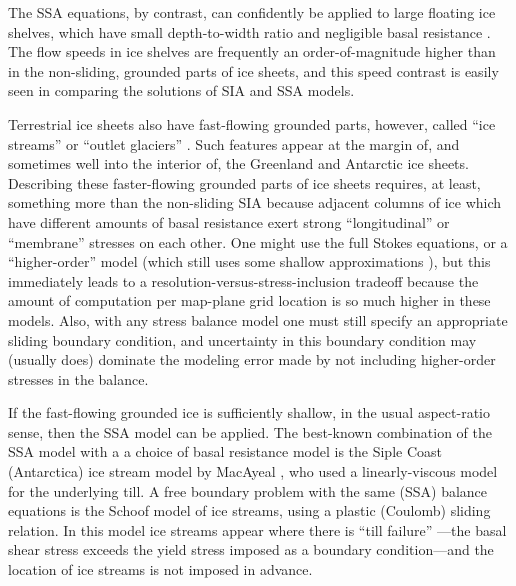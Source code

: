 \documentclass[titlepage,letterpaper,final]{scrartcl}
\begin{document}
The SSA equations, by contrast, can confidently be applied to large floating ice shelves, which have small depth-to-width ratio and negligible basal resistance \cite{Morland,MorlandZainuddin}.  The flow speeds in ice shelves are frequently an order-of-magnitude higher than in the non-sliding, grounded parts of ice sheets, and this speed contrast is easily seen in comparing the solutions of SIA and SSA models.

Terrestrial ice sheets also have fast-flowing grounded parts, however, called ``ice streams'' or ``outlet glaciers'' \cite{TrufferEchelmeyer}.  Such features appear at the margin of, and sometimes well into the interior of, the Greenland \cite{Joughinetal2001} and Antarctic \cite{BamberVaughanJoughin} ice sheets.  Describing these faster-flowing grounded parts of ice sheets requires, at least, something more than the non-sliding SIA because adjacent columns of ice which have different amounts of basal resistance exert strong ``longitudinal'' or ``membrane'' stresses \cite{SchoofStream} on each other.  One might use the full Stokes equations, or a ``higher-order'' model (which still uses some shallow approximations \cite{Blatter,Pattyn03}), but this immediately leads to a resolution-versus-stress-inclusion tradeoff because the amount of computation per map-plane grid location is so much higher in these models.  Also, with any stress balance model one must still specify an appropriate sliding boundary condition, and uncertainty in this boundary condition may (usually does) dominate the modeling error made by not including higher-order stresses in the balance.

If the fast-flowing grounded ice is sufficiently shallow, in the usual aspect-ratio sense, then the SSA model can be applied.  The best-known combination of the SSA model with a a choice of basal resistance model is the Siple Coast (Antarctica) ice stream model by MacAyeal \cite{MacAyeal}, who used a linearly-viscous model for the underlying till.  A free boundary problem with the same (SSA) balance equations is the Schoof \cite{SchoofStream} model of ice streams, using a plastic (Coulomb) sliding relation.  In this model ice streams appear where there is ``till failure'' \cite{Paterson}---the basal shear stress exceeds the yield stress imposed as a boundary condition---and the location of ice streams is not imposed in advance.
\end{document}
